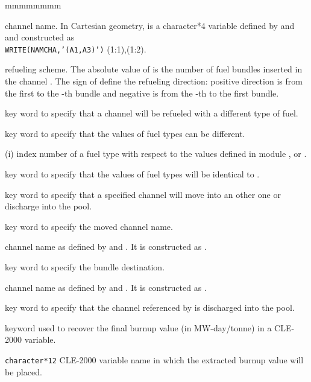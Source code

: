 \begin{ListeDeDescription}{mmmmmmmm}
\item[\dusa{NAMCHA}] channel name. In Cartesian geometry,  is a character*4 variable defined by  and
 and constructed as \\
{\tt WRITE(NAMCHA,'(A1,A3)')} (1:1),(1:2).

\item[\dusa{nsh}] refueling scheme. The absolute value of  is
the number of fuel bundles inserted in the channel .
The sign of  define the refueling direction: positive direction
is from the first to the -th bundle and negative is from the 
-th to the first bundle.

\item[\moc{NEWFUEL}] key word to specify that a channel will be refueled
with a different type of fuel.

\item[\moc{SOME}] key word to specify that the  values of
fuel types can be different.

\item[\dusa{imix}(i)] index number of a fuel type with respect to the
values defined in module ,  or .

\item[\moc{ALL}] key word to specify that the  values of
fuel types will be identical to .

\item[\moc{SHUFF}] key word to specify that a specified channel will
move into an other one or discharge into the pool.

\item[\moc{CHAN}] key word to specify the moved channel name.

\item[\dusa{NMCHA1}] channel name as defined by  and
. It is constructed as . 

\item[\moc{TO}] key word to specify the bundle destination.

\item[\dusa{NMCHA2}] channel name as defined by  and
. It is constructed as . 

\item[\moc{POOL}] key word to specify that the channel referenced by
 is discharged into the pool.

\item[\moc{PICK}]  keyword used to recover the final burnup value (in MW-day/tonne) in a CLE-2000 variable.

\item[\dusa{burnup}] \texttt{character*12} CLE-2000 variable name in which the extracted burnup value will be placed.

\end{ListeDeDescription}
\clearpage

